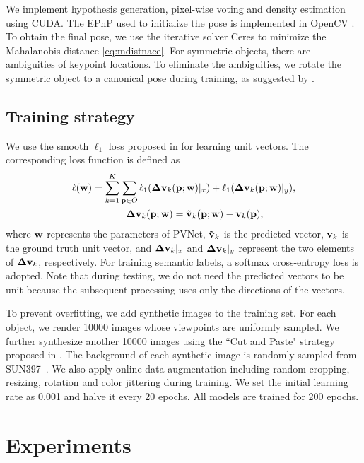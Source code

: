 \documentclass[10pt,twocolumn,letterpaper]{article}
\begin{document}
We implement hypothesis generation, pixel-wise voting and density estimation using CUDA. The EPnP \cite{lepetit2009epnp} used to initialize the pose is implemented in OpenCV \cite{bradski2000opencv}. To obtain the final pose, we use the iterative solver Ceres \cite{ceres-solver} to minimize the Mahalanobis distance \eqref{eq:mdistnace}. For symmetric objects, there are ambiguities of keypoint locations. To eliminate the ambiguities, we rotate the symmetric object to a canonical pose during training, as suggested by \cite{rad2017bb8}.

\subsection{Training strategy}

We use the smooth $\ell_1$ loss proposed in \cite{girshick2015fast} for learning unit vectors. The corresponding loss function is defined as
\begin{align}
    \ell({\bf w})=\sum\limits_{k=1}^K &\sum\limits_{{\bf p}\in O}^{} \ell_1({\bf \Delta v}_k({\bf p};{\bf w})|_x) + \ell_1({\bf \Delta v}_k({\bf p};{\bf w})|_y), \nonumber
    \\
    &~~{\bf \Delta v}_k({\bf p};{\bf w})={\bf \tilde{v}}_k({\bf p};{\bf w})-{\bf v}_k({\bf p}),
\end{align}
where $\bf w$ represents the parameters of PVNet, ${\bf \tilde{v}}_k$ is the predicted vector, ${\bf v}_k$ is the ground truth unit vector, and ${\bf \Delta v}_k|_x$ and ${\bf \Delta v}_k|_y$ represent the two elements of ${\bf \Delta v}_k$, respectively. For training semantic labels, a softmax cross-entropy loss is adopted. Note that during testing, we do not need the predicted vectors to be unit because the subsequent processing uses only the directions of the vectors.

To prevent overfitting, we add synthetic images to the training set. For each object, we render 10000 images whose viewpoints are uniformly sampled. We further synthesize another 10000 images using the ``Cut and Paste" strategy proposed in \cite{dwibedi2017cut}. The background of each synthetic image is randomly sampled from SUN397~\cite{xiao2010sun}. We also apply online data augmentation including random cropping, resizing, rotation and color jittering during training. We set the initial learning rate as 0.001 and halve it every 20 epochs. All models are trained for 200 epochs.
 \section{Experiments}
\end{document}
